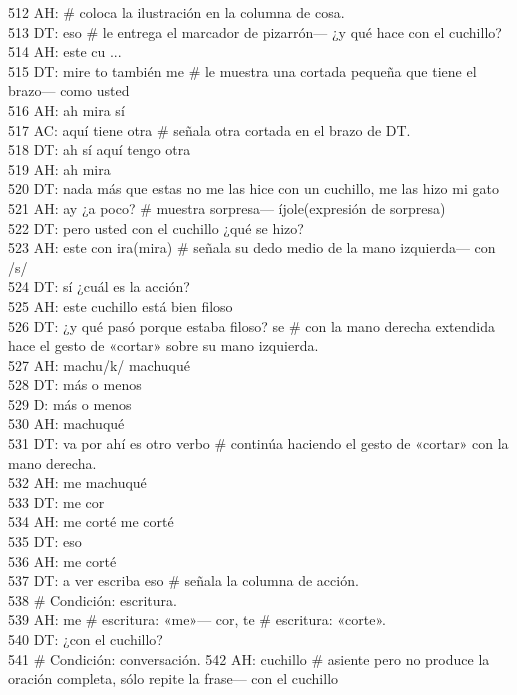 512 AH: \# coloca la ilustración en la columna de cosa.\\
513 DT: eso \# le entrega el marcador de pizarrón--- ¿y qué hace con el cuchillo?\\
514 AH: este cu ...\\
515 DT: mire to también me \# le muestra una cortada pequeña que tiene el brazo--- como usted\\
516 AH: ah mira sí\\
517 AC: aquí tiene otra \# señala otra cortada en el brazo de DT.\\
518 DT: ah sí aquí tengo otra\\
519 AH: ah mira\\
520 DT: nada más que estas no me las hice con un cuchillo, me las hizo mi gato\\
521 AH: ay ¿a poco? \# muestra sorpresa--- íjole(expresión de sorpresa)\\
522 DT: pero usted con el cuchillo ¿qué se hizo?\\
523 AH: este con ira(mira) \# señala su dedo medio de la mano izquierda--- con /s/\\
524 DT: sí ¿cuál es la acción?\\
525 AH: este cuchillo está bien filoso\\
526 DT: ¿y qué pasó porque estaba filoso? se \# con la mano derecha extendida hace el gesto de «cortar» sobre su mano izquierda.\\
527 AH: machu/k/ machuqué\\
528 DT: más o menos\\
529 D: más o menos\\
530 AH: machuqué\\
531 DT: va por ahí es otro verbo \# continúa haciendo el gesto de «cortar» con la mano derecha.\\
532 AH: me machuqué\\
533 DT: me cor\\
534 AH: me corté me corté\\
535 DT: eso\\
536 AH: me corté\\
537 DT: a ver escriba eso \# señala la columna de acción.\\
538 \# Condición: escritura.\\
539 AH: me \# escritura: «me»--- cor, te \# escritura: «corte».\\
540 DT: ¿con el cuchillo?\\
541 \# Condición: conversación.
542 AH: cuchillo \# asiente pero no produce la oración completa, sólo repite la frase--- con el cuchillo\\
